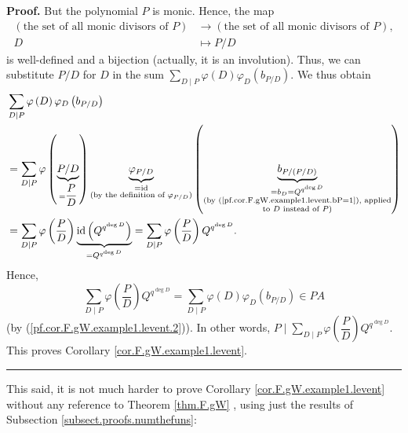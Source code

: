 \documentclass[numbers=enddot,12pt,final,onecolumn,notitlepage]{scrartcl}%
\theoremstyle{definition}
\newenvironment{proof}[1][Proof]{\noindent\textbf{#1.} }{\ \rule{0.5em}{0.5em}}
\let\sumnonlimits\sum
\renewcommand{\sum}{\sumnonlimits\limits}
\begin{document}
\begin{proof}
But the polynomial $P$ is monic. Hence, the map%
\begin{align*}
\left(  \text{the set of all monic divisors of }P\right)   &  \rightarrow
\left(  \text{the set of all monic divisors of }P\right)  ,\\
D  &  \mapsto P/D
\end{align*}
is well-defined and a bijection (actually, it is an involution). Thus, we can
substitute $P/D$ for $D$ in the sum $\sum_{D\mid P}\varphi\left(  D\right)
\varphi_{D}\left(  b_{P/D}\right)  $. We thus obtain%
\begin{align*}
&  \sum_{D\mid P}\varphi\left(  D\right)  \varphi_{D}\left(  b_{P/D}\right) \\
&  =\sum_{D\mid P}\varphi\left(  \underbrace{P/D}_{=\dfrac{P}{D}}\right)
\underbrace{\varphi_{P/D}}_{\substack{=\operatorname*{id}\\\text{(by the
definition of }\varphi_{P/D}\text{)}}}\left(  \underbrace{b_{P/\left(
P/D\right)  }}_{\substack{=b_{D}=Q^{q^{\deg D}}\\\text{(by
(\ref{pf.cor.F.gW.example1.levent.bP=1}), applied}\\\text{to }D\text{ instead
of }P\text{)}}}\right) \\
&  =\sum_{D\mid P}\varphi\left(  \dfrac{P}{D}\right)
\underbrace{\operatorname*{id}\left(  Q^{q^{\deg D}}\right)  }_{=Q^{q^{\deg
D}}}=\sum_{D\mid P}\varphi\left(  \dfrac{P}{D}\right)  Q^{q^{\deg D}}.
\end{align*}
Hence,%
\[
\sum_{D\mid P}\varphi\left(  \dfrac{P}{D}\right)  Q^{q^{\deg D}}=\sum_{D\mid
P}\varphi\left(  D\right)  \varphi_{D}\left(  b_{P/D}\right)  \in PA
\]
(by (\ref{pf.cor.F.gW.example1.levent.2})). In other words, $P\mid\sum_{D\mid
P}\varphi\left(  \dfrac{P}{D}\right)  Q^{q^{\deg D}}$. This proves Corollary
\ref{cor.F.gW.example1.levent}.
\end{proof}

This said, it is not much harder to prove Corollary
\ref{cor.F.gW.example1.levent} without any reference to Theorem \ref{thm.F.gW}%
, using just the results of Subsection \ref{subsect.proofs.numthefuns}:
\end{document}

